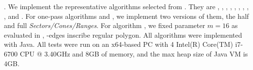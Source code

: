 


.
We implement the representative algorithms selected from . They are \opt, \dpa, \tpa, \opwa, \bqsa, \squishe, \operb, \siped, \cised, \intersec and \interval.
For one-pass algorithms \siped and \cised, we implement two versions of them, \ie the half and full \emph{Sectors/Cones/Ranges}.
For algorithm \cised, we fixed parameter $m=16$ as evaluated in \cite{Lin:Cised}, -edges inscribe regular polygon.
All algorithms were implemented with Java.
All tests were run on an x64-based  PC with 4 Intel(R) Core(TM) i7-6700 CPU @
3.40GHz  and 8GB of memory, and {the max heap size of Java VM is 4GB.}


